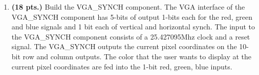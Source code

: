 \begin{enumerate}
\item \textbf{ (18 pts.)}
Build the VGA\_SYNCH component.
The VGA interface of the VGA\_SYNCH component has 5-bits of output
1-bits each for the red, green and
blue signals and 1 bit each of vertical and horizontal synch. The
input to the VGA\_SYNCH component consists of a 25.427095Mhz clock and a reset 
signal. The VGA\_SYNCH outputs the current pixel coordinates on the 
10-bit row and column outputs. The color that the user wants to 
display at the current pixel coordinates are fed into the 1-bit 
red, green, blue inputs.



\end{enumerate}
